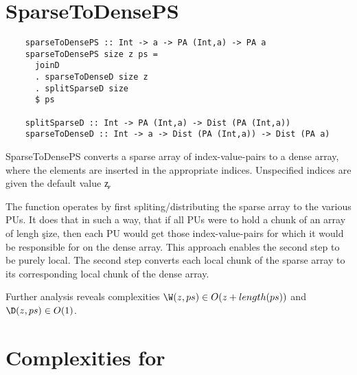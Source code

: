 
\section*{SparseToDensePS}
  \begin{lstlisting}
    sparseToDensePS :: Int -> a -> PA (Int,a) -> PA a
    sparseToDensePS size z ps = 
      joinD
      . sparseToDenseD size z
      . splitSparseD size
      $ ps

    splitSparseD :: Int -> PA (Int,a) -> Dist (PA (Int,a))
    sparseToDenseD :: Int -> a -> Dist (PA (Int,a)) -> Dist (PA a)
  \end{lstlisting}
  SparseToDensePS converts a sparse array of index-value-pairs
  to a dense array, where the elements are inserted in the appropriate
  indices. Unspecified indices are given the default value \c{z}.

  The function operates by first spliting/distributing the sparse array
  to the various PUs. It does that in such a way, that if all PUs were to
  hold a chunk of an array of lengh \c{size}, then each PU would get
  those index-value-pairs for which it would be responsible for on the
  dense array. This approach enables the second step to be purely local.
  The second step converts each local chunk of the sparse array to its corresponding
  local chunk of the dense array.

  Further analysis reveals complexities $\W(z,ps) \in O(z + length(ps))$
  and $\D(z,ps) \in O(1)$.
  
\section*{Complexities for \ndpv}  

